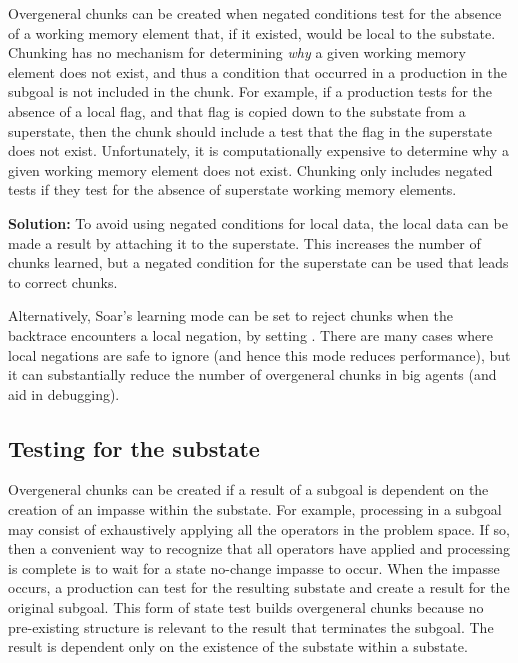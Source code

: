 Overgeneral chunks can be created when negated conditions test for the absence
of a working memory element that, if it existed, would be local to the
substate.  Chunking has no mechanism for determining \textit{why} a given
working memory element does not exist, and thus a condition that occurred in a
production in the subgoal is not included in the chunk. For example, if a
production tests for the absence of a local flag, and that flag is copied down
to the substate from a superstate, then the chunk should include a test that
the flag in the superstate does not exist. 
Unfortunately, it is computationally expensive to determine why a given
working memory element does not exist. Chunking only includes negated tests if
they test for the absence of superstate working memory elements. 

\textbf{Solution:} To avoid using negated conditions for local data, the local
data can be made a result by attaching it to the superstate. This increases
the number of chunks learned, but a negated condition for the superstate can
be used that leads to correct chunks.

Alternatively, Soar's learning mode can be set to reject chunks when the
backtrace encounters a local negation, by setting . There are many cases where local negations
are safe to ignore (and hence this mode reduces performance), but it can
substantially reduce the number of overgeneral chunks in big agents (and aid in
debugging).


\subsection{Testing for the substate}

Overgeneral chunks can be created if a result of a subgoal is dependent on the
creation of an impasse within the substate. For example, processing in a
subgoal may consist of exhaustively applying all the operators in the problem
space. If so, then a convenient way to recognize that all operators have
applied and processing is complete is to wait for a state no-change impasse to
occur. When the impasse occurs, a production can test for the resulting
substate and create a result for the original subgoal. This form of state test
builds overgeneral chunks because no pre-existing structure is relevant to the
result that terminates the subgoal. The result is dependent only on the
existence of the substate within a substate.

